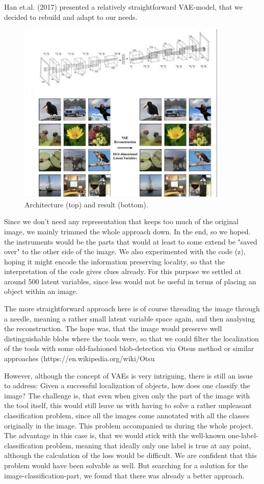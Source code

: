 Han et.al. (2017) presented a relatively straightforward VAE-model, that we decided to rebuild and adapt to our needs. 

\begin{figure}
	\centering
	\includegraphics[width=10cm]{3_methodology/VAE_arch}
	\caption{Architecture (top) and result (bottom).}
	\label{fig:VAE}
\end{figure}


Since we don't need any representation that keeps too much of the original image, we mainly trimmed the whole approach down.
In the end, so we hoped. the instruments would be the parts that would at least to some extend be "saved over" to the other side of the image. We also experimented with the code (z), hoping it might encode the information preserving locality, so that the interpretation of the code gives clues already. For this purpose we settled at around 500 latent variables, since less would not be useful in terms of placing an object within an image. 

The more straightforward approach here is of course threading the image through a needle, meaning a rather small latent variable space again, and then analysing the reconstruction. The hope was, that the image would preserve well distinguishable blobs where the tools were, so that we could filter the localization of the tools with some old-fashioned blob-detection via Otsus method or similar approaches (https://en.wikipedia.org/wiki/Otsu%

However, although the concept of VAEs is very intriguing, there is still an issue to address: Given a successful localization of objects, how does one classify the image?
The challenge is, that even when given only the part of the image with the tool itself, this would still leave us with having to solve a rather unpleasant classification problem, since all the images come annotated with all the classes originally in the image. This problem accompanied us during the whole project. The advantage in this case is, that we would stick with the well-known one-label-classification problem, meaning that ideally only one label is true at any point, although the calculation of the loss would be difficult. We are confident that this problem would have been solvable as well. But searching for a solution for the image-classification-part, we found that there was already a better approach.

